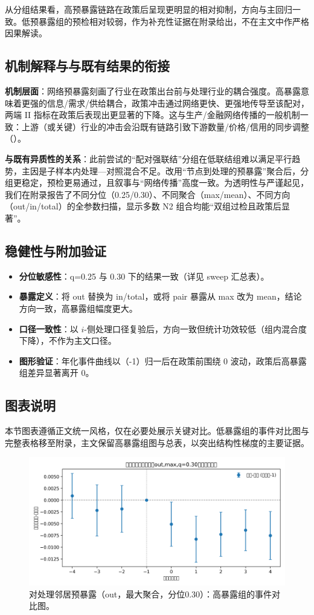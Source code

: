 从分组结果看，高预暴露链路在政策后呈现更明显的相对抑制，方向与主回归一致。低预暴露组的预检相对较弱，作为补充性证据在附录给出，不在主文中作严格因果解读。
\subsection{机制解释与与既有结果的衔接}
\textbf{机制层面}：网络预暴露刻画了行业在政策出台前与处理行业的耦合强度。高暴露意味着更强的信息/需求/供给耦合，政策冲击通过网络更快、更强地传导至该配对，两端 II 指标在政策后表现出更显著的下降。这与生产/金融网络传播的一般机制一致：上游（或关键）行业的冲击会沿既有链路引致下游数量/价格/信用的同步调整（\citep{acemoglu2012network,carvalho2014micro,diebold2014connectedness}）。

\textbf{与既有异质性的关系}：此前尝试的“配对强联结”分组在低联结组难以满足平行趋势，主因是子样本内处理—对照混合不足。改用“节点到处理的预暴露”聚合后，分组更稳定，预检更易通过，且叙事与“网络传播”高度一致。为透明性与严谨起见，我们在附录报告了不同分位（0.25/0.30）、不同聚合（max/mean）、不同方向（out/in/total）的全参数扫描，显示多数 N2 组合均能“双组过检且政策后显著”。

\subsection{稳健性与附加验证}
\begin{itemize}
  \item \textbf{分位敏感性}：q=0.25 与 0.30 下的结果一致（详见 sweep 汇总表）。
  \item \textbf{暴露定义}：将 out 替换为 in/total，或将 pair 暴露从 max 改为 mean，结论方向一致，高暴露组幅度更大。
  \item \textbf{口径一致性}：以 \(i\)-侧处理口径复验后，方向一致但统计功效较低（组内混合度下降），不作为主文口径。
  \item \textbf{图形验证}：年化事件曲线以（-1）归一后在政策前围绕 0 波动，政策后高暴露组差异显著离开 0。
\end{itemize}

\subsection{图表说明}
本节图表遵循正文统一风格，仅在必要处展示关键对比。低暴露组的事件对比图与完整表格移至附录，主文保留高暴露组图与总表，以突出结构性梯度的主要证据。

\begin{figure}[!htbp]
  \centering
  \includegraphics[width=0.85\linewidth]{figures/heterogeneity_event_exposure_out_max_q30_high.png}
  \caption{对处理邻居预暴露（out，最大聚合，分位0.30）：高暴露组的事件对比图。}
  \label{fig:hetero_expo_high}
\end{figure}


